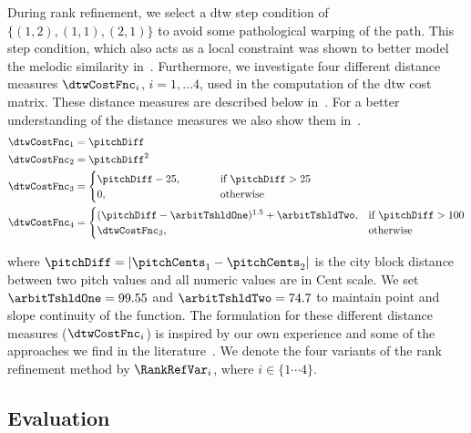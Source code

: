 During rank refinement, we select a \gls{dtw} step condition of $\lbrace(1,2), (1,1), (2,1)\rbrace$ to avoid some pathological warping of the path. This step condition, which also acts as a local constraint was shown to better model the melodic similarity in~. Furthermore, we investigate four different distance measures $\dtwCostFnc_i$, $i=1,\dots 4$, used in the computation of the \gls{dtw} cost matrix. These distance measures are described below in~. For a better understanding of the distance measures we also show them in~.
\begin{equation}
\begin{aligned}
\dtwCostFnc_1& = \pitchDiff \hspace{.5em}\\
\dtwCostFnc_2& = \pitchDiff^2 \hspace{.5em}\\
\dtwCostFnc_3& = 
\begin{cases}
\pitchDiff-25, & \hspace{1cm} \text{if } \pitchDiff >25\\
0, & \hspace{1cm}\text{otherwise } 
\end{cases}\\
\dtwCostFnc_4 &= 
\begin{cases}
(\pitchDiff-\arbitTshldOne)^{1.5} + \arbitTshldTwo, & \text{if } \pitchDiff >100\\
\dtwCostFnc_3, & \text{otherwise}
\end{cases}
\end{aligned}
\label{eq:distance_measures_discovery}
\end{equation}

\noindent where $\pitchDiff = |\pitchCents_1-\pitchCents_2|$ is the city block distance between two pitch values and all numeric values are in Cent scale. We set $\arbitTshldOne =99.55$ and $\arbitTshldTwo = 74.7$ to maintain point and slope continuity of the function. The formulation for these different distance measures ($\dtwCostFnc_i$) is inspired by our own experience and some of the approaches we find in the literature~\citep{Ishwar2013,Rao2014}. We denote the four variants of the rank refinement method by $\RankRefVar_i$, where $i \in \lbrace 1\cdots4 \rbrace$.


\subsection{Evaluation}

